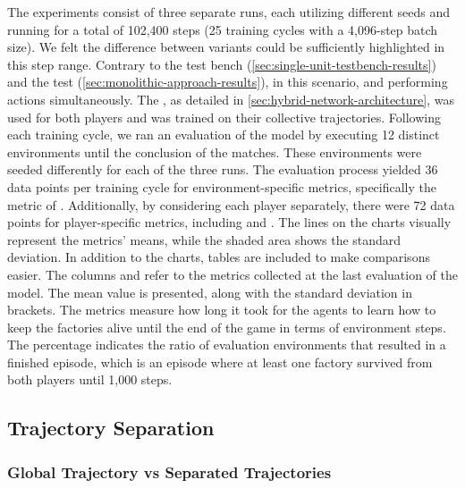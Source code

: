 \bigskip

\noindent The experiments consist of three separate runs, each utilizing different seeds and running for a total of 102,400 steps (25 training cycles with a 4,096-step batch size). We felt the difference between variants could be sufficiently highlighted in this step range. Contrary to the  test bench (\autoref{sec:single-unit-testbench-results}) and the  test (\autoref{sec:monolithic-approach-results}), in this scenario,  and performing actions simultaneously. The , as detailed in \autoref{sec:hybrid-network-architecture}, was used for both players and was trained on their collective trajectories. Following each training cycle, we ran an evaluation of the model by executing 12 distinct environments until the conclusion of the matches. These environments were seeded differently for each of the three runs. The evaluation process yielded 36 data points per training cycle for environment-specific metrics, specifically the metric of . Additionally, by considering each player separately, there were 72 data points for player-specific metrics, including  and . The lines on the charts visually represent the metrics' means, while the shaded area shows the standard deviation. In addition to the charts, tables are included to make comparisons easier. The columns  and  refer to the metrics collected at the last evaluation of the model. The mean value is presented, along with the standard deviation in brackets. The  metrics measure how long it took for the agents to learn how to keep the factories alive until the end of the game in terms of environment steps. The percentage indicates the ratio of evaluation environments that resulted in a finished episode, which is an episode where at least one factory survived from both players until 1,000 steps.

\subsection{Trajectory Separation} \label{sec:trajectory-separation}

\subsubsection{Global Trajectory vs Separated Trajectories}

